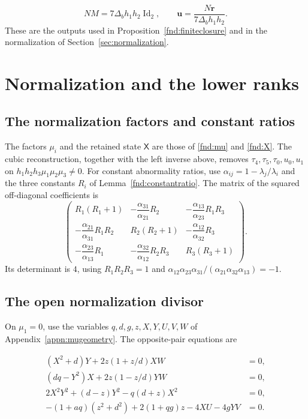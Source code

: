 \[
 NM=7\Delta_bh_1h_2\operatorname{Id}_2,\qquad
 \boldsymbol u=\frac{N\boldsymbol r}{7\Delta_bh_1h_2}.
\]
These are the outputs used in Proposition~\ref{fnd:finiteclosure}
and in the normalization of Section~\ref{sec:normalization}.

\clearpage
\section{Normalization and the lower ranks}\label{supp:normalization}

\subsection{The normalization factors and constant ratios}

The factors $\mu_i$ and the retained state $\mathsf X$ are those of
\eqref{fnd:mu} and \eqref{fnd:X}. The cubic reconstruction,
together with the left inverse above, removes
$\tau_4,\tau_5,\tau_0,u_0,u_1$ on
$h_1h_2h_3\mu_1\mu_2\mu_3\ne0$.
For constant abnormality ratios, use
$\alpha_{ij}=1-\lambda_j/\lambda_i$ and the three constants $R_i$
of Lemma~\ref{fnd:constantratio}. The matrix of the squared
off-diagonal coefficients is
\[
\begin{pmatrix}
R_1(R_1+1)&-\dfrac{\alpha_{31}}{\alpha_{21}}R_2&-\dfrac{\alpha_{13}}{\alpha_{23}}R_1R_3\\
-\dfrac{\alpha_{21}}{\alpha_{31}}R_1R_2&R_2(R_2+1)&-\dfrac{\alpha_{12}}{\alpha_{32}}R_3\\
-\dfrac{\alpha_{23}}{\alpha_{13}}R_1&-\dfrac{\alpha_{32}}{\alpha_{12}}R_2R_3&R_3(R_3+1)
\end{pmatrix}.
\]
Its determinant is $4$, using
$R_1R_2R_3=1$ and
$\alpha_{12}\alpha_{23}\alpha_{31}/(\alpha_{21}\alpha_{32}\alpha_{13})=-1$.

\subsection{The open normalization divisor}

On $\mu_1=0$, use the variables $q,d,g,z,X,Y,U,V,W$ of
Appendix~\ref{appn:mugeometry}. The opposite-pair equations are

\begin{align}
(X^2+d)Y+2z(1+z/d)XW&=0,\label{supp:fnd:mue2}\\
(dq-Y^2)X+2z(1-z/d)YW&=0,\label{supp:fnd:mue3}\\
2X^2Y^2+(d-z)Y^2-q(d+z)X^2&=0,\label{supp:fnd:mubiquad}\\
-(1+aq)(z^2+d^2)+2(1+qg)z-4XU-4gYV&=0.\label{supp:fnd:muquadratic}
\end{align}

